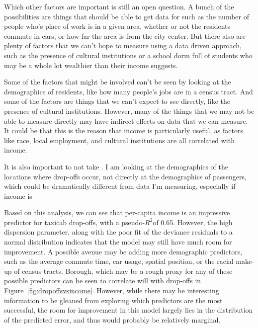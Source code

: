 \documentclass[11pt]{article}
\newcommand{\fref}[1]{Figure~\ref{fig:#1}}
\newcommand{\prsq}{$\mbox{pseudo-}R^2$}
\begin{document}
Which other factors are important is still an open question.
A bunch of the possibilities are things that should be able to get data for such as the number of people who's place of work is in a given area, whether or not the residents commute in cars, or how far the area is from the city center.
But there also are plenty of factors that we can't hope to measure using a data driven approach, such as the presence of cultural institutions or a school dorm full of students who may be a whole lot wealthier than their income suggests.

Some of the factors that might be involved can't be seen by looking at the demographics of residents, like how many people's jobs are in a census tract.
And some of the factors are things that we can't expect to see directly, like the presence of cultural institutions.
However, many of the things that we may not be able to measure directly may have indirect effects on data that we can measure.
It could be that this is the reason that income is particularly useful, as factors like race, local employment, and cultural institutions are all correlated with income.

It is also important to not take .
I am looking at the  demographics of the locations where drop-offs occur,  not directly at the demographics of passengers, which could be dramatically different from data I'm measuring, especially if income is 






Based on this analysis, we can see that per-capita income is an impressive predictor for taxicab drop-offs, with a \prsq of 0.65.
However, the high dispersion parameter, along with the poor fit of the deviance residuals to a normal distribution indicates that the model may still have much room for improvement.
A possible avenue may be adding more demographic predictors, such as the average commute time, car usage, spatial position, or the racial make-up of census tracts. Borough, which may be a rough proxy for any of these possible predictors can be seen to correlate will with drop-offs in \fref{dropoffsvsincome}.
However, while there may be interesting information to be gleaned from exploring which predictors are the most successful, the room for improvement in this model largely lies in the distribution of the predicted error, and thus would probably be relatively marginal.
\end{document}
